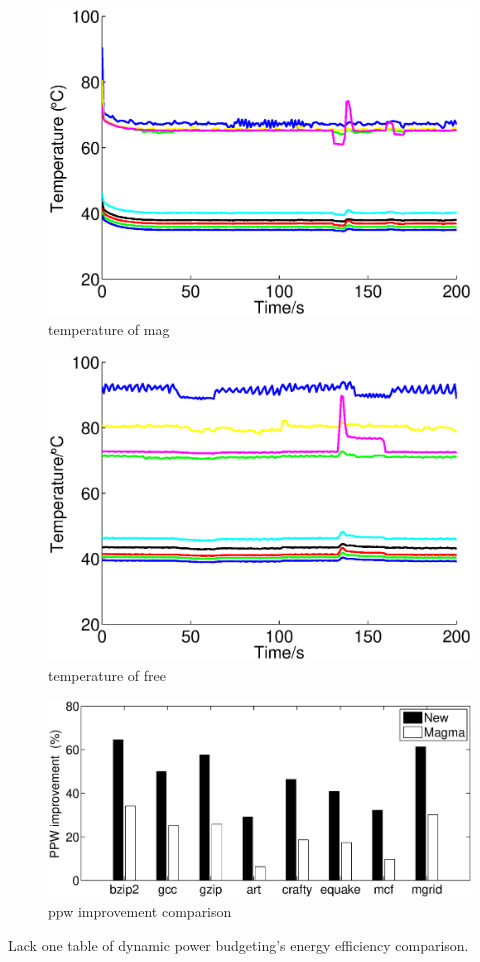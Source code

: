 \begin{figure}
\centering
\includegraphics[width=1\linewidth]{fig/tem_mag.eps}
\caption{temperature of mag}
\end{figure}

\begin{figure}
\centering
\includegraphics[width=1\linewidth]{fig/tem_free.eps}
\caption{temperature of free}
\end{figure}

\begin{figure}
\centering
\includegraphics[width=1\linewidth]{fig/transient_ppw.eps}
\caption{ppw improvement comparison}
\end{figure}


Lack one table of dynamic power budgeting's energy efficiency comparison.